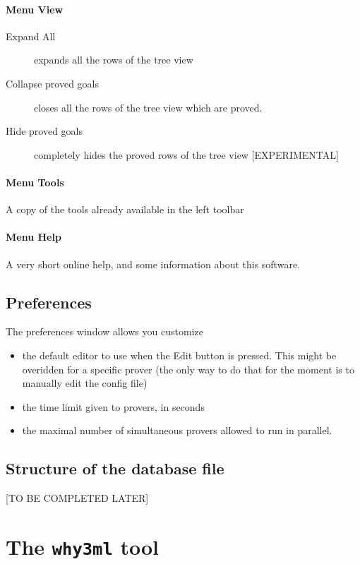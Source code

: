 \paragraph{Menu \textsf{View}}
\begin{description}
\item[Expand All] expands all the rows of the tree view
\item[Collapse proved goals] closes all the rows of the tree view
  which are proved.
\item[Hide proved goals] completely hides the proved rows of the tree
  view [EXPERIMENTAL]
\end{description}

\paragraph{Menu \textsf{Tools}}
A copy of the tools already available in the left toolbar

\paragraph{Menu \textsf{Help}}
A very short online help, and some information about this software.

\subsection{Preferences}

The preferences window allows you customize
\begin{itemize}
\item the default editor to use when the \textsf{Edit} button is
  pressed. This might be overidden for a specific prover (the only way
  to do that for the moment is to manually edit the config file)
\item the time limit given to provers, in seconds
\item the maximal number of simultaneous provers allowed to run in parallel. 
\end{itemize}

\subsection{Structure of the database file}

[TO BE COMPLETED LATER]

\section{The \texttt{why3ml} tool}

